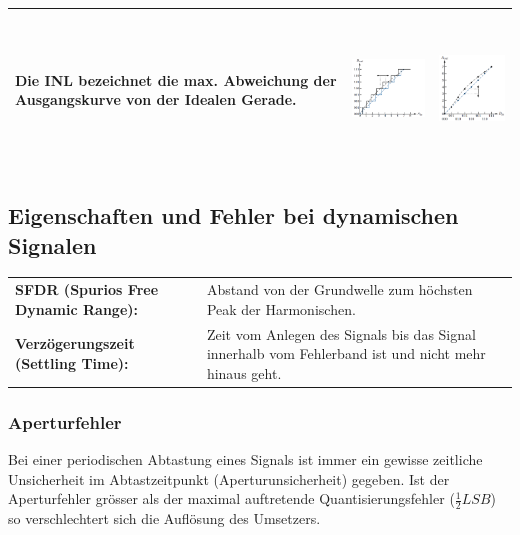 \begin{tabular}{|p{5.5cm}|c|c|}
  Die INL bezeichnet die max. Abweichung der Ausgangskurve von der Idealen Gerade.
	& \includegraphics[height=3.5cm, valign=t]{./pictures/INL_ADC.png}
	& \includegraphics[height=4cm, valign=t]{./pictures/INL_DAC.png}
	\\ \hline
\end{tabular}
\subsection{Eigenschaften und Fehler bei dynamischen Signalen}

\begin{tabular}{l p{11cm}}
  \textbf{SFDR (Spurios Free Dynamic Range):} &
  Abstand von der Grundwelle zum höchsten Peak der Harmonischen. \\
  \textbf{Verzögerungszeit (Settling Time):} &
  Zeit vom Anlegen des Signals bis das Signal innerhalb vom Fehlerband ist und nicht mehr hinaus geht.
\end{tabular}

\subsubsection{Aperturfehler} 
Bei einer periodischen Abtastung eines Signals ist immer ein gewisse zeitliche
Unsicherheit im Abtastzeitpunkt (Aperturunsicherheit) gegeben. Ist der Aperturfehler grösser als der maximal auftretende Quantisierungsfehler ($\frac{1}{2}LSB$) so verschlechtert sich die Auflösung des Umsetzers. 

